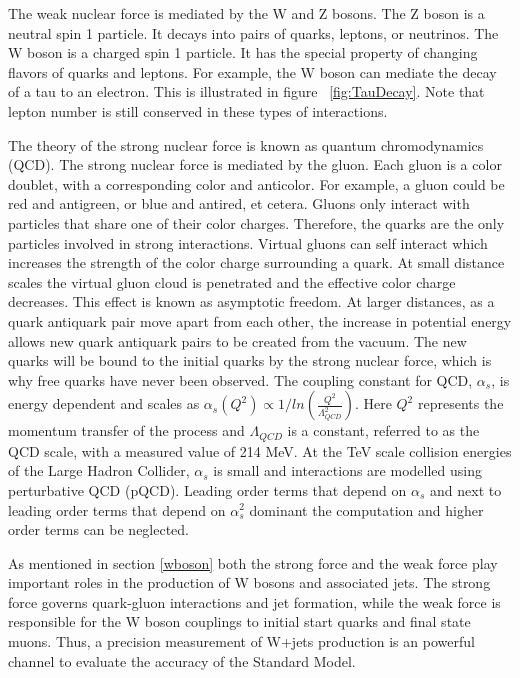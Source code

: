 \documentclass[oneside, letterpaper, oldfontcommands]{memoir}
\begin{document}
\qquad The weak nuclear force is mediated by the W and Z bosons. The Z boson is a neutral spin 1 particle. It decays into pairs of quarks, leptons, or neutrinos. The W boson is a charged spin 1 particle. It has the special property of changing flavors of quarks and leptons. For example, the W boson can mediate the decay of a tau to an electron. This is illustrated in figure ~\ref{fig:TauDecay}. Note that lepton number is still conserved in these types of interactions.  

\qquad The theory of the strong nuclear force is known as quantum chromodynamics (QCD). The strong nuclear force is mediated by the gluon. Each gluon is a color doublet, with a corresponding color and anticolor. For example, a gluon could be red and antigreen, or blue and antired, et cetera. Gluons only interact with particles that share one of their color charges. Therefore, the quarks are the only particles involved in strong interactions. Virtual gluons can self interact which increases the strength of the color charge surrounding a quark. At small distance scales the virtual gluon cloud is penetrated and the effective color charge decreases. This effect is known as asymptotic freedom. \cite{Halzen:1984mc} At larger distances, as a quark antiquark pair move apart from each other, the increase in potential energy allows new quark antiquark pairs to be created from the vacuum. The new quarks will be bound to the initial quarks by the strong nuclear force, which is why free quarks have never been observed. 
\qquad The coupling constant for QCD, $\alpha_{s}$, is energy dependent and scales as $\alpha_{s}(Q^{2}) \propto 1/ln(\frac{Q^{2}}{\Lambda_{QCD}^{2}})$. Here $Q^{2}$ represents the momentum transfer of the process and $\Lambda_{QCD}$ is a constant, referred to as the QCD scale, with a measured value of 214 MeV\cite{Agashe:2014kda}. At the TeV scale collision energies of the Large Hadron Collider, $\alpha_{s}$ is small and interactions are modelled using perturbative QCD (pQCD). Leading order terms that depend on $\alpha_{s}$ and next to leading order terms that depend on $\alpha_{s}^{2}$ dominant the computation and higher order terms can be neglected.

\qquad As mentioned in section \ref{wboson} both the strong force and the weak force play important roles in the production of W bosons and associated jets. The strong force governs quark-gluon interactions and jet formation, while the weak force is responsible for the W boson couplings to initial start quarks and final state muons. Thus, a precision measurement of W+jets production is an powerful channel to evaluate the accuracy of the Standard Model.
\end{document}
